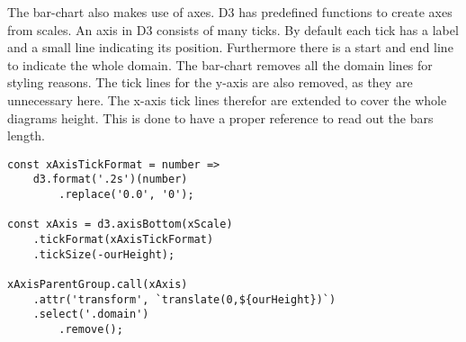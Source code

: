 The bar-chart also makes use of axes. D3 has predefined functions to create axes from scales. An axis in D3 consists of many ticks. By default each tick has a label and a small line indicating its position. Furthermore there is a start and end line to indicate the whole domain. The bar-chart removes all the domain lines for styling reasons. The tick lines for the y-axis are also removed, as they are unnecessary here. The x-axis tick lines therefor are extended to cover the whole diagrams height. This is done to have a proper reference to read out the bars length.

\begin{minipage}{\linewidth}
    \begin{lstlisting}[style=htmlcssjs, captionpos=b, caption={The x axis implementation of the bar chart. The first constant defines the tick format. For each number there should be two significant digits. As the zero value is represented as "0.0" to match the previous rule of two significant digits, it is simply replaced by "0". The second constant defines the function creating the axis. The previous tick format is passed here. Furthermore the \texttt{tickSize} is set to the hight of the diagram. This way the initially small tick lines now cover the whole height of the diagram and allow for easier and more accurate readouts. Finally the \texttt{xAxisParentGroup} element, which is part of ther permantent hierarchical structure of the bar-chart, calls the \texttt{xAxis} function. This adds the Axis to the diagram. As a last step the domain lines are selected and removed for styling reasons.}, label={lst:bar-chart-axes}]
const xAxisTickFormat = number =>
    d3.format('.2s')(number)
        .replace('0.0', '0');

const xAxis = d3.axisBottom(xScale)
    .tickFormat(xAxisTickFormat)
    .tickSize(-ourHeight);

xAxisParentGroup.call(xAxis)
    .attr('transform', `translate(0,${ourHeight})`)
    .select('.domain')
        .remove();
    \end{lstlisting}
\end{minipage}

